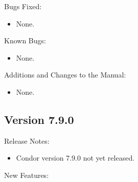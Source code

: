\noindent Bugs Fixed:

\begin{itemize}

\item None.

\end{itemize}

\noindent Known Bugs:

\begin{itemize}

\item None.

\end{itemize}

\noindent Additions and Changes to the Manual:

\begin{itemize}

\item None.

\end{itemize}


\subsection*{\label{sec:New-7-9-0}Version 7.9.0}

\noindent Release Notes:

\begin{itemize}

\item Condor version 7.9.0 not yet released.

\end{itemize}


\noindent New Features:

